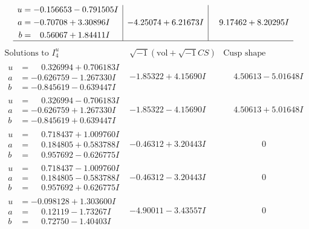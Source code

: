 \documentclass[1p]{elsarticle_modified}
\theoremstyle{definition}
\newcommand{\I}{\sqrt{-1}}
\begin{document}
$$\begin{array}{c|c|c}
\begin{aligned}
u &= -0.156653 - 0.791505 I \\
a &= -0.70708 + 3.30896 I \\
b &= \phantom{-}0.56067 + 1.84411 I\end{aligned}
 & -4.25074 + 6.21673 I & \phantom{-}9.17462 + 8.20295 I\\
 \hline 
 \end{array}$$\newpage$$\begin{array}{c|c|c}  
\text{Solutions to }I^u_{4}& \I (\text{vol} + \sqrt{-1}CS) & \text{Cusp shape}\\
 \hline 
\begin{aligned}
u &= \phantom{-}0.326994 + 0.706183 I \\
a &= -0.626759 - 1.267330 I \\
b &= -0.845619 - 0.639447 I\end{aligned}
 & -1.85322 + 4.15690 I & \phantom{-}4.50613 - 5.01648 I \\ \hline\begin{aligned}
u &= \phantom{-}0.326994 - 0.706183 I \\
a &= -0.626759 + 1.267330 I \\
b &= -0.845619 + 0.639447 I\end{aligned}
 & -1.85322 - 4.15690 I & \phantom{-}4.50613 + 5.01648 I \\ \hline\begin{aligned}
u &= \phantom{-}0.718437 + 1.009760 I \\
a &= \phantom{-}0.184805 + 0.583788 I \\
b &= \phantom{-}0.957692 - 0.626775 I\end{aligned}
 & -0.46312 + 3.20443 I & \phantom{-0.000000 } 0 \\ \hline\begin{aligned}
u &= \phantom{-}0.718437 - 1.009760 I \\
a &= \phantom{-}0.184805 - 0.583788 I \\
b &= \phantom{-}0.957692 + 0.626775 I\end{aligned}
 & -0.46312 - 3.20443 I & \phantom{-0.000000 } 0 \\ \hline\begin{aligned}
u &= -0.098128 + 1.303600 I \\
a &= \phantom{-}0.12119 - 1.73267 I \\
b &= \phantom{-}0.72750 - 1.40403 I\end{aligned}
 & -4.90011 - 3.43557 I & \phantom{-0.000000 } 0 \\ \hline\begin{aligned}

\end{aligned}
\end{array}$$
\end{document}
